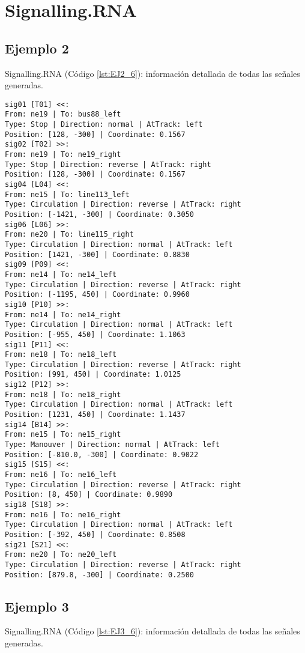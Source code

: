 \chapter{Signalling.RNA}
	\label{sec:signallingRNA}
	
	\section{Ejemplo 2}
	Signalling.RNA (Código \ref{lst:EJ2_6}): información detallada de todas las señales generadas.
	
	\begin{lstlisting}[language = {}, caption = Signalling.RNA, label = {lst:EJ2_6}]
sig01 [T01] <<:
From: ne19 | To: bus88_left
Type: Stop | Direction: normal | AtTrack: left 
Position: [128, -300] | Coordinate: 0.1567
sig02 [T02] >>:
From: ne19 | To: ne19_right
Type: Stop | Direction: reverse | AtTrack: right 
Position: [128, -300] | Coordinate: 0.1567
sig04 [L04] <<:
From: ne15 | To: line113_left
Type: Circulation | Direction: reverse | AtTrack: right 
Position: [-1421, -300] | Coordinate: 0.3050
sig06 [L06] >>:
From: ne20 | To: line115_right
Type: Circulation | Direction: normal | AtTrack: left 
Position: [1421, -300] | Coordinate: 0.8830
sig09 [P09] <<:
From: ne14 | To: ne14_left
Type: Circulation | Direction: reverse | AtTrack: right 
Position: [-1195, 450] | Coordinate: 0.9960
sig10 [P10] >>:
From: ne14 | To: ne14_right
Type: Circulation | Direction: normal | AtTrack: left 
Position: [-955, 450] | Coordinate: 1.1063
sig11 [P11] <<:
From: ne18 | To: ne18_left
Type: Circulation | Direction: reverse | AtTrack: right 
Position: [991, 450] | Coordinate: 1.0125
sig12 [P12] >>:
From: ne18 | To: ne18_right
Type: Circulation | Direction: normal | AtTrack: left 
Position: [1231, 450] | Coordinate: 1.1437
sig14 [B14] >>:
From: ne15 | To: ne15_right
Type: Manouver | Direction: normal | AtTrack: left 
Position: [-810.0, -300] | Coordinate: 0.9022
sig15 [S15] <<:
From: ne16 | To: ne16_left
Type: Circulation | Direction: reverse | AtTrack: right 
Position: [8, 450] | Coordinate: 0.9890
sig18 [S18] >>:
From: ne16 | To: ne16_right
Type: Circulation | Direction: normal | AtTrack: left 
Position: [-392, 450] | Coordinate: 0.8508
sig21 [S21] <<:
From: ne20 | To: ne20_left
Type: Circulation | Direction: reverse | AtTrack: right 
Position: [879.8, -300] | Coordinate: 0.2500
	\end{lstlisting}
	\section{Ejemplo 3}
	Signalling.RNA (Código \ref{lst:EJ3_6}): información detallada de todas las señales generadas.
	
